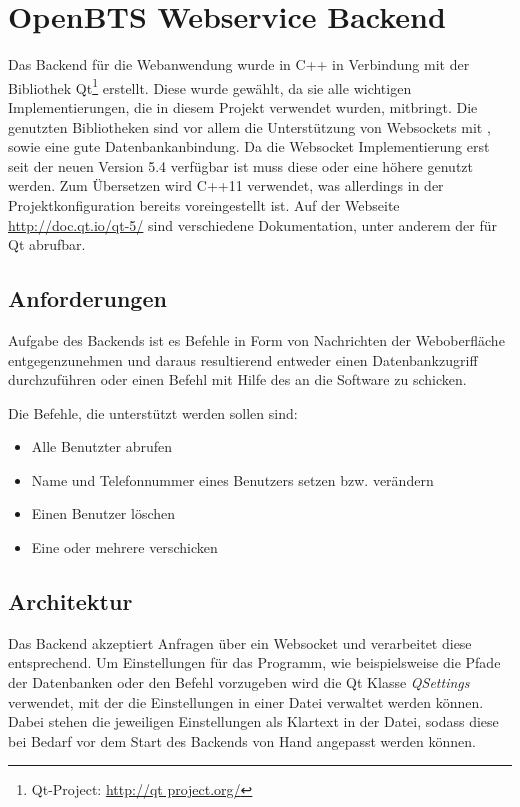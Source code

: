 \section{OpenBTS Webservice Backend}
\label{sec:backend}
Das Backend für die Webanwendung wurde in C++ in Verbindung mit der Bibliothek Qt\footnote{Qt-Project: \url{http://qt project.org/}} erstellt. Diese wurde gewählt, da sie alle wichtigen Implementierungen, die in diesem Projekt verwendet wurden, mitbringt. Die genutzten Bibliotheken sind vor allem die Unterstützung von Websockets mit \JSON, sowie eine gute Datenbankanbindung. Da die Websocket Implementierung erst seit der neuen Version 5.4 verfügbar ist muss diese oder eine höhere genutzt werden. Zum Übersetzen wird C++11 verwendet, was allerdings in der Projektkonfiguration bereits voreingestellt ist. Auf der Webseite \url{http://doc.qt.io/qt-5/} sind verschiedene Dokumentation, unter anderem der \API für Qt abrufbar.

\subsection{Anforderungen}

Aufgabe des Backends ist es Befehle in Form von \JSON Nachrichten der Weboberfläche entgegenzunehmen und daraus resultierend entweder einen Datenbankzugriff durchzuführen oder einen Befehl mit Hilfe des \CLI an die \OpenBTS Software zu schicken.

Die Befehle, die unterstützt werden sollen sind:

\begin{itemize}
	\item Alle Benutzter abrufen
	\item Name und Telefonnummer eines Benutzers setzen bzw. verändern
	\item Einen Benutzer löschen
	\item Eine oder mehrere \SMS verschicken
\end{itemize}

\subsection{Architektur}

Das Backend akzeptiert \JSON Anfragen über ein Websocket und verarbeitet diese entsprechend. Um Einstellungen für das Programm, wie beispielsweise die Pfade der Datenbanken oder den \SMS Befehl vorzugeben wird die Qt Klasse \textit{QSettings} verwendet, mit der die Einstellungen in einer Datei verwaltet werden können. Dabei stehen die jeweiligen Einstellungen als Klartext in der Datei, sodass diese bei Bedarf vor dem Start des Backends von Hand angepasst werden können.

